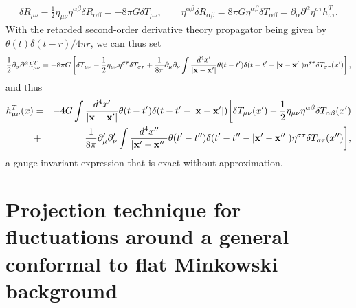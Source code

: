 \documentclass[aps]{revtex4}
\begin{document}
%
\begin{eqnarray}
\delta R_{\mu\nu}-\frac{1}{2}\eta_{\mu\nu}\eta^{\alpha\beta}\delta R_{\alpha\beta}=-8\pi G\delta T_{\mu\nu},\qquad \eta^{\alpha\beta}\delta R_{\alpha\beta}=8\pi G \eta^{\alpha\beta}\delta T_{\alpha\beta}=
\partial_{\alpha}\partial^{\alpha}\eta^{\sigma\tau}h^T_{\sigma\tau}.
\label{E43}
\end{eqnarray}
%
With the retarded second-order derivative theory propagator being given by $\theta(t)\delta(t-r)/4\pi r$, we can thus set
%
\begin{eqnarray}
\frac{1}{2}\partial_{\alpha}\partial^{\alpha}h^T_{\mu\nu}=-8\pi G\left[\delta T_{\mu\nu}-
\frac{1}{2}\eta_{\mu\nu}\eta^{\sigma\tau}\delta T_{\sigma\tau}
+\frac{1}{8\pi}\partial_{\mu}\partial_{\nu}\int \frac{d^4x^{\prime}}{|{\bf x}-{\bf x}^{\prime}|}
\theta(t-t^{\prime})\delta(t-t^{\prime}-|{\bf x}-{\bf x}^{\prime}|)\eta^{\sigma\tau}\delta T_{\sigma\tau}(x^{\prime})\right],
\label{E44}
\end{eqnarray}
%
and thus
%
\begin{eqnarray}
h_{\mu\nu}^{T}(x)&=&-4G\int \frac{d^4x^{\prime}}{|{\bf x}-{\bf x}^{\prime}|}\theta(t-t^{\prime})\delta(t-t^{\prime}-|{\bf x}-{\bf x}^{\prime}|)
\bigg{[}\delta T_{\mu\nu}(x^{\prime})-\frac{1}{2}\eta_{\mu\nu}\eta^{\alpha\beta}\delta T_{\alpha \beta}(x^{\prime})
\nonumber\\
&+&\frac{1}{8\pi}\partial^{\prime}_{\mu}\partial^{\prime}_{\nu}\int \frac{d^4x^{\prime\prime}}{|{\bf x}^{\prime}-{\bf x}^{\prime\prime}|}\theta(t^{\prime}-t^{\prime\prime})\delta(t^{\prime}-t^{\prime\prime}-|{\bf x}^{\prime}-{\bf x}^{\prime\prime}|)\eta^{\sigma\tau}\delta T_{\sigma\tau}(x^{\prime\prime})\bigg{]},
\label{E45}
\end{eqnarray}
%
a gauge invariant expression that is exact without approximation.

\section{Projection technique for fluctuations around a general conformal to flat Minkowski background}
\label{SF}
\end{document}

